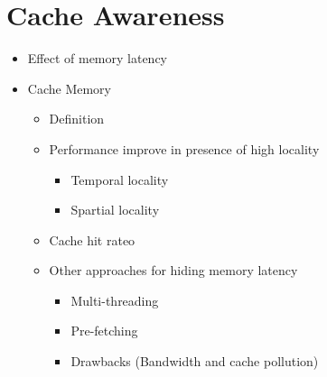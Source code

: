 \documentclass[12pt,oneside]{report}
\begin{document}
\chapter{Cache Awareness}
\begin{itemize}
    \item Effect of memory latency
    \item Cache Memory
    \begin{itemize}
        \item Definition
        \item Performance improve in presence of high locality
        \begin{itemize}
            \item Temporal locality
            \item Spartial locality
        \end{itemize}
        \item Cache hit rateo
        \item Other approaches for hiding memory latency
        \begin{itemize}
            \item Multi-threading
            \item Pre-fetching
            \item Drawbacks (Bandwidth and cache pollution)
        \end{itemize}
    \end{itemize}
\end{itemize}
\end{document}
